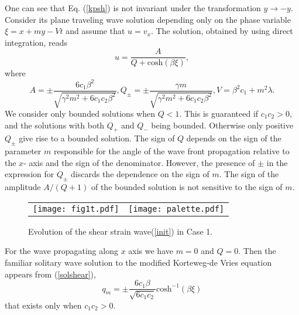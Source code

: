 One can see that Eq. (\ref{kpsh}) is not invariant under the transformation $y\rightarrow -y$.  Consider its plane traveling wave solution depending only on the phase variable $\xi=x+ m y-V t$ and assume that $u=v_x$. 
The solution, obtained by using direct integration, reads
\begin{equation}
	u=\frac{A}{Q+{\text{cosh}}( \beta \xi)},\label{solshear}
\end{equation}
where
\begin{equation}
	A=\pm \frac{6c_1 \beta^2}{\sqrt{\gamma^2 m^2+6 c_1 c_2 \beta^2}}, 
	Q_{\pm}=\pm\frac{\gamma m }{\sqrt{\gamma^2 m^2+6 c_1 c_2 \beta^2}},  V=\beta^2 c_1+m^2 \lambda . \label{solshearpar}
\end{equation}
We consider only bounded solutions when $Q<1$. This is guaranteed if $c_1 c_2>0$, and the solutions with both $Q_{+}$  and $Q_{-}$ being bounded. Otherwise only positive $Q_{\pm}$ give rise to a bounded solution.  The sign of $Q$ depends on the sign of the parameter $m$ responsible for the angle of the wave front propagation relative to the $x$- axis and the sign of the denominator.  However, the presence of $\pm$ in the expression for $Q_{\pm}$ discards the dependence on the sign of $m$. The sign of the amplitude $A/(Q+1)$ of the bounded solution is not sensitive to the sign of $m$. 
\begin{figure}[h]
	\begin{center}
		\begin{tabular}{cc}
			\texttt{[image: fig1t.pdf]} & \texttt{[image: palette.pdf]}
		\end{tabular}
		\caption{Evolution of the shear strain wave(\ref{init}) in Case 1.}\label{fig1}
	\end{center}
\end{figure}
For the wave propagating along $x$ axis we have $m=0$ and $Q=0$. Then the familiar solitary wave solution to the modified Korteweg-de Vries equation appears from (\ref{solshear}),
\begin{equation}
	q_m=\pm \frac{6c_1\beta}{\sqrt{6 c_1 c_2}}{\text{cosh}}^{-1}(\beta \xi) \label{qp}
\end{equation}
that exists only when $c_1 c_2>0$. 

